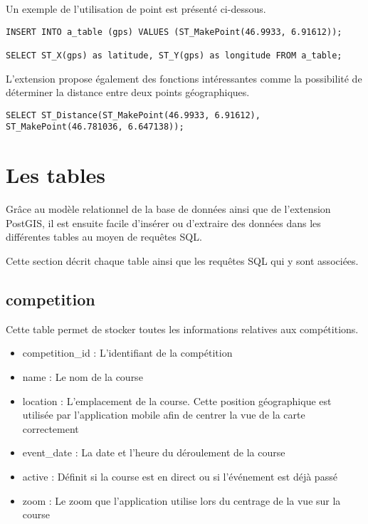 Un exemple de l'utilisation de point est présenté ci-dessous.

\begin{lstlisting}[style=SQLStyle]
INSERT INTO a_table (gps) VALUES (ST_MakePoint(46.9933, 6.91612));

SELECT ST_X(gps) as latitude, ST_Y(gps) as longitude FROM a_table;
\end{lstlisting}

L'extension propose également des fonctions intéressantes comme la possibilité de déterminer la distance entre deux points géographiques.

\begin{lstlisting}[style=SQLStyle]
SELECT ST_Distance(ST_MakePoint(46.9933, 6.91612), ST_MakePoint(46.781036, 6.647138));
\end{lstlisting}

\section{Les tables}

Grâce au modèle relationnel de la base de données ainsi que de l'extension PostGIS, il est ensuite facile d'insérer ou d'extraire des données dans les différentes tables au moyen de requêtes SQL.

Cette section décrit chaque table ainsi que les requêtes SQL qui y sont associées.

\subsection{competition}

Cette table permet de stocker toutes les informations relatives aux compétitions.

\begin{itemize}
\item competition\_id : L'identifiant de la compétition
\item name : Le nom de la course
\item location : L'emplacement de la course. Cette position géographique est utilisée par l'application mobile afin de centrer la vue de la carte correctement
\item event\_date : La date et l'heure du déroulement de la course
\item active : Définit si la course est en direct ou si l'événement est déjà passé
\item zoom : Le zoom que l'application utilise lors du centrage de la vue sur la course
\end{itemize}

